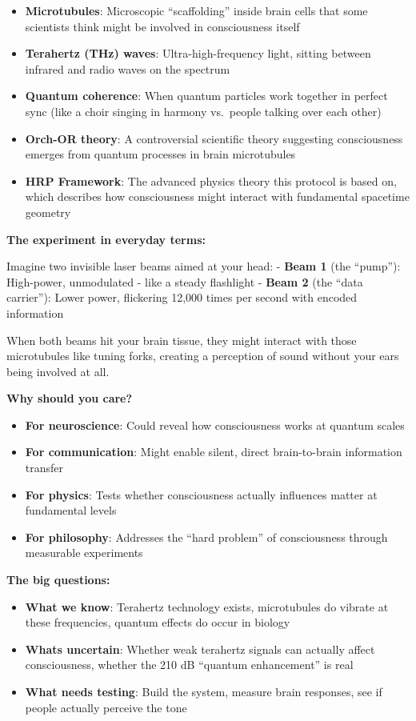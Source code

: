 \begin{itemize}
\tightlist
\item
  \textbf{Microtubules}: Microscopic ``scaffolding'' inside brain cells
  that some scientists think might be involved in consciousness itself
\item
  \textbf{Terahertz (THz) waves}: Ultra-high-frequency light, sitting
  between infrared and radio waves on the spectrum
\item
  \textbf{Quantum coherence}: When quantum particles work together in
  perfect sync (like a choir singing in harmony vs.~people talking over
  each other)
\item
  \textbf{Orch-OR theory}: A controversial scientific theory suggesting
  consciousness emerges from quantum processes in brain microtubules
\item
  \textbf{HRP Framework}: The advanced physics theory this protocol is
  based on, which describes how consciousness might interact with
  fundamental spacetime geometry
\end{itemize}

\textbf{The experiment in everyday terms:}

Imagine two invisible laser beams aimed at your head: - \textbf{Beam 1}
(the ``pump''): High-power, unmodulated - like a steady flashlight -
\textbf{Beam 2} (the ``data carrier''): Lower power, flickering 12,000
times per second with encoded information

When both beams hit your brain tissue, they might interact with those
microtubules like tuning forks, creating a perception of sound without
your ears being involved at all.

\textbf{Why should you care?}

\begin{itemize}
\tightlist
\item
  \textbf{For neuroscience}: Could reveal how consciousness works at
  quantum scales
\item
  \textbf{For communication}: Might enable silent, direct brain-to-brain
  information transfer
\item
  \textbf{For physics}: Tests whether consciousness actually influences
  matter at fundamental levels
\item
  \textbf{For philosophy}: Addresses the ``hard problem'' of
  consciousness through measurable experiments
\end{itemize}

\textbf{The big questions:}

\begin{itemize}
\tightlist
\item
  \textbf{What we know}: Terahertz technology exists, microtubules do
  vibrate at these frequencies, quantum effects do occur in biology
\item
  \textbf{What\textquotesingle s uncertain}: Whether weak terahertz
  signals can actually affect consciousness, whether the 210 dB
  ``quantum enhancement'' is real
\item
  \textbf{What needs testing}: Build the system, measure brain
  responses, see if people actually perceive the tone
\end{itemize}

